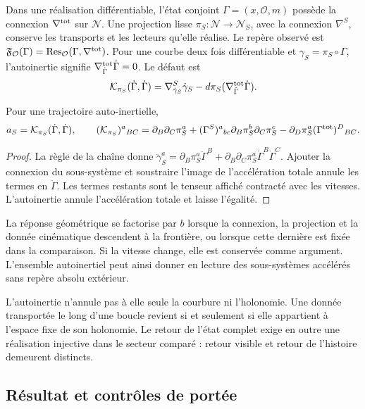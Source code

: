 Dans une réalisation différentiable, l’état conjoint $\Gamma=(x,\mathcal O,m)$ possède la connexion $\nabla^{\rm tot}$ sur $\mathcal N$. Une projection lisse $\pi_S:\mathcal N\to\mathcal N_S$, avec la connexion $\nabla^S$, conserve les transports et les lecteurs qu’elle réalise. Le repère observé est $\mathfrak F_{\mathcal O}(\Gamma)
=\operatorname{Res}_{\mathcal O}(\Gamma,\nabla^{\rm tot})$. Pour une courbe deux fois différentiable et $\gamma_S=\pi_S\circ\Gamma$, l’autoinertie signifie $\nabla^{\rm tot}_{\dot\Gamma}\dot\Gamma=0$. Le défaut est
\[
\mathcal K_{\pi_S}(\dot\Gamma,\dot\Gamma)
=\nabla^S_{\dot\gamma_S}\dot\gamma_S
-d\pi_S(\nabla^{\rm tot}_{\dot\Gamma}\dot\Gamma).
\]
\begin{proposition}
\label{hmtcuatro:gea:aceleracion}
Pour une trajectoire auto-inertielle,
\begin{equation}
a_S=\mathcal K_{\pi_S}(\dot\Gamma,\dot\Gamma),\qquad
(\mathcal K_{\pi_S})^a{}_{BC}
=\partial_B\partial_C\pi_S^a
+(\Gamma^S)^a{}_{bc}\partial_B\pi_S^b\partial_C\pi_S^c
-\partial_D\pi_S^a(\Gamma^{\rm tot})^D{}_{BC}.
\label{hmtcuatro:gea:defecto}
\end{equation}
\end{proposition}
\begin{proof}
La règle de la chaîne donne $\ddot\gamma_S^a=\partial_B\pi_S^a\ddot\Gamma^B
+\partial_B\partial_C\pi_S^a\dot\Gamma^B\dot\Gamma^C$. Ajouter la connexion du sous-système et soustraire l’image de l’accélération totale annule les termes en $\ddot\Gamma$. Les termes restants sont le tenseur affiché contracté avec les vitesses. L’autoinertie annule l’accélération totale et laisse l’égalité.
\end{proof}
La réponse géométrique se factorise par $b$ lorsque la connexion, la projection et la donnée cinématique descendent à la frontière, ou lorsque cette dernière est fixée dans la comparaison. Si la vitesse change, elle est conservée comme argument. L’ensemble autoinertiel peut ainsi donner en lecture des sous-systèmes accélérés sans repère absolu extérieur.

L’autoinertie n’annule pas à elle seule la courbure ni l’holonomie. Une donnée transportée le long d’une boucle revient si et seulement si elle appartient à l’espace fixe de son holonomie. Le retour de l’état complet exige en outre une réalisation injective dans le secteur comparé : retour visible et retour de l’histoire demeurent distincts.

\subsection{Résultat et contrôles de portée}
\label{hmtcuatro:gea:conclusion}


